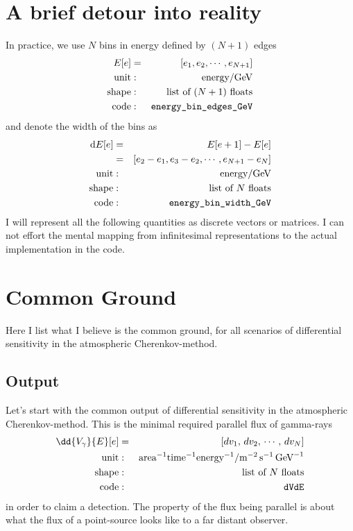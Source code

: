 \documentclass{article}%
\begin{document}
    \section{A brief detour into reality}
        In practice, we use $N$ bins in energy defined by $(N+1)$ edges
        \begin{eqnarray*}
            E[e] &=& [e_1, e_2, \cdots, e_{N+1}]\\
            \text{unit} &:& \text{energy} / \text{GeV}\\
            \text{shape} &:& \text{list of}\,\,(N + 1)\,\,\text{floats}\\
            \text{code} &:& \verb|energy_bin_edges_GeV|
        \end{eqnarray*}
        and denote the width of the bins as
        \begin{eqnarray*}
            \text{d}E[e] &=& E[e+1] - E[e]\\
            &=& [e_2-e_1, e_3-e_2, \cdots, e_{N+1}-e_N]\\
            \text{unit} &:& \text{energy} / \text{GeV}\\
            \text{shape} &:& \text{list of}\,\,N\,\,\text{floats}\\
            \text{code} &:& \verb|energy_bin_width_GeV|
        \end{eqnarray*}
        I will represent all the following quantities as discrete vectors or matrices.
        I can not effort the mental mapping from infinitesimal representations to the actual implementation in the code.
    \section{Common Ground}
        \label{SecCommonGround}
        Here I list what I believe is the common ground, for all scenarios of differential sensitivity in the atmospheric Cherenkov-method.
        \subsection{Output}
            Let's start with the common output of differential sensitivity in the atmospheric Cherenkov-method.
            This is the minimal required parallel flux of gamma-rays
            \begin{eqnarray*}
                \dd{V_\gamma}{E}[e] &=& [dv_1, \, dv_2, \, \cdots, \, dv_N]\\
                \text{unit} &:& \text{area}^{-1} \text{time}^{-1} \text{energy}^{-1} / \text{m}^{-2}\,\text{s}^{-1}\,\text{GeV}^{-1}\\
                \text{shape} &:& \text{list of}\,\,N\,\,\text{floats}\\
                \text{code} &:& \verb|dVdE|
            \end{eqnarray*}
            in order to claim a detection.
            The property of the flux being parallel is about what the flux of a point-source looks like to a far distant observer.
\end{document}
